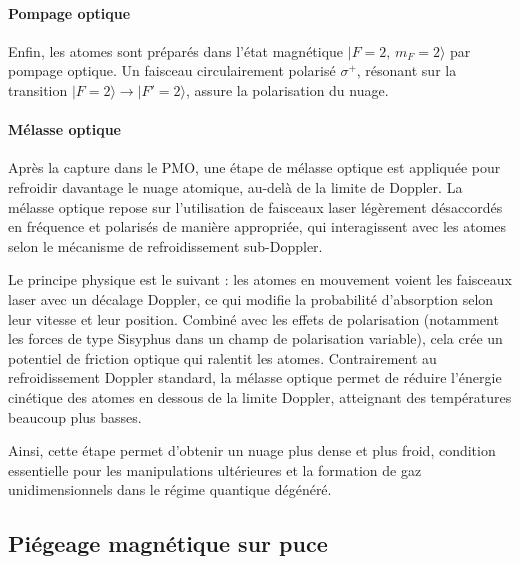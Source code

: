 \paragraph{Pompage optique}
Enfin, les atomes sont préparés dans l’état magnétique \( |F=2,\,m_F=2\rangle \) par pompage optique. Un faisceau circulairement polarisé \( \sigma^+ \), résonant sur la transition \( |F=2\rangle \rightarrow |F'=2\rangle \), assure la polarisation du nuage.

\paragraph{Mélasse optique}
Après la capture dans le PMO, une étape de mélasse optique est appliquée pour refroidir davantage le nuage atomique, au-delà de la limite de Doppler. La mélasse optique repose sur l’utilisation de faisceaux laser légèrement désaccordés en fréquence et polarisés de manière appropriée, qui interagissent avec les atomes selon le mécanisme de refroidissement sub-Doppler.

Le principe physique est le suivant : les atomes en mouvement voient les faisceaux laser avec un décalage Doppler, ce qui modifie la probabilité d’absorption selon leur vitesse et leur position. Combiné avec les effets de polarisation (notamment les forces de type Sisyphus dans un champ de polarisation variable), cela crée un potentiel de friction optique qui ralentit les atomes. Contrairement au refroidissement Doppler standard, la mélasse optique permet de réduire l’énergie cinétique des atomes en dessous de la limite Doppler, atteignant des températures beaucoup plus basses.

Ainsi, cette étape permet d’obtenir un nuage plus dense et plus froid, condition essentielle pour les manipulations ultérieures et la formation de gaz unidimensionnels dans le régime quantique dégénéré.






\subsection{Piégeage magnétique sur puce}

